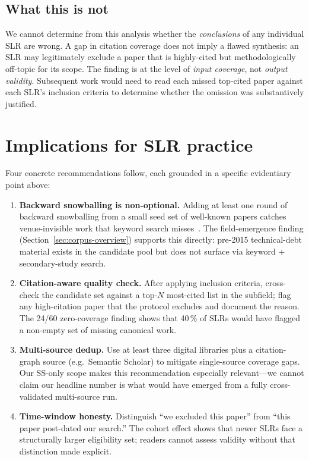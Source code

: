 \documentclass[conference]{IEEEtran}
\begin{document}
\subsection{What this is not}

We cannot determine from this analysis whether the \emph{conclusions} of any
individual SLR are wrong. A gap in citation coverage does not imply a
flawed synthesis: an SLR may legitimately exclude a paper that is
highly-cited but methodologically off-topic for its scope. The finding is
at the level of \emph{input coverage}, not \emph{output validity}.
Subsequent work would need to read each missed top-cited paper against
each SLR's inclusion criteria to determine whether the omission was
substantively justified.

\section{Implications for SLR practice}

Four concrete recommendations follow, each grounded in a specific
evidentiary point above:

\begin{enumerate}
  \item \textbf{Backward snowballing is non-optional.} Adding at least one
        round of backward snowballing from a small seed set of well-known
        papers catches venue-invisible work that keyword search
        misses~\cite{wohlin2014snowballing}. The field-emergence finding
        (Section~\ref{sec:corpus-overview}) supports this directly:
        pre-2015 technical-debt material exists in the candidate pool but
        does not surface via keyword + secondary-study search.
  \item \textbf{Citation-aware quality check.} After applying inclusion
        criteria, cross-check the candidate set against a top-$N$
        most-cited list in the subfield; flag any high-citation paper that
        the protocol excludes and document the reason. The 24/60
        zero-coverage finding shows that 40\,\% of SLRs would have flagged
        a non-empty set of missing canonical work.
  \item \textbf{Multi-source dedup.} Use at least three digital libraries
        plus a citation-graph source (e.g.\ Semantic Scholar) to mitigate
        single-source coverage gaps. Our SS-only scope makes this
        recommendation especially relevant---we cannot claim our headline
        number is what would have emerged from a fully cross-validated
        multi-source run.
  \item \textbf{Time-window honesty.} Distinguish ``we excluded this
        paper'' from ``this paper post-dated our search.'' The cohort
        effect shows that newer SLRs face a structurally larger
        eligibility set; readers cannot assess validity without that
        distinction made explicit.
\end{enumerate}
\end{document}
